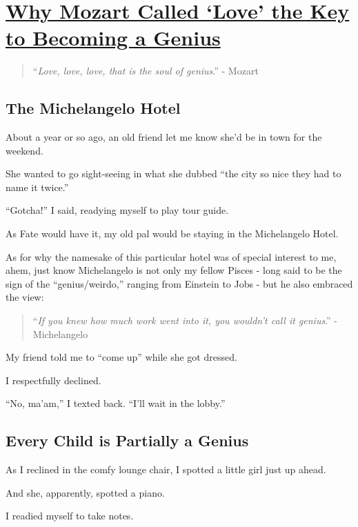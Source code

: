 \documentclass{book}
\numberwithin{equation}{section}
\begin{document}

\chapter{\href{https://psiloveyou.xyz/why-mozart-called-love-the-key-to-becoming-a-genius-f2141ac4c9ae}{Why Mozart Called `Love' the Key to Becoming a Genius}}

\begin{quotation}
    ``\textit{Love, love, love, that is the soul of genius}.'' - Mozart
\end{quotation}

\section{The Michelangelo Hotel}
About a year or so ago, an old friend let me know she'd be in town for the weekend.

She wanted to go sight-seeing in what she dubbed ``the city so nice they had to name it twice.''

%
``Gotcha!'' I said, readying myself to play tour guide.

%
As Fate would have it, my old pal would be staying in the Michelangelo Hotel.

%
As for why the namesake of this particular hotel was of special interest to me, ahem, just know Michelangelo is not only my fellow Pisces - long said to be the sign of the ``genius/weirdo,'' ranging from Einstein to Jobs - but he also embraced the view:

\begin{quotation}
    ``\textit{If you knew how much work went into it, you wouldn't call it genius}.'' - Michelangelo
\end{quotation}
My friend told me to ``come up'' while she got dressed.

I respectfully declined.

%
``No, ma'am,'' I texted back. ``I'll wait in the lobby.''

\section{Every Child is Partially a Genius}
As I reclined in the comfy lounge chair, I spotted a little girl just up ahead.

And she, apparently, spotted a piano.

%
I readied myself to take notes.
\end{document}
